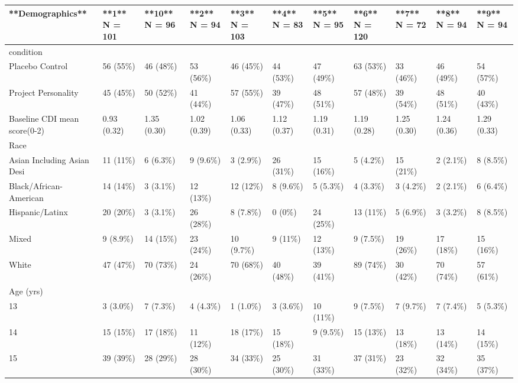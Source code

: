\begin{table}[ht]
\centering
\begin{tabular}{lllllllllll}
  \hline
**Demographics** & **1**  
N = 101 & **10**  
N = 96 & **2**  
N = 94 & **3**  
N = 103 & **4**  
N = 83 & **5**  
N = 95 & **6**  
N = 120 & **7**  
N = 72 & **8**  
N = 94 & **9**  
N = 94 \\ 
  \hline
condition &  &  &  &  &  &  &  &  &  &  \\ 
  Placebo Control & 56 (55\%) & 46 (48\%) & 53 (56\%) & 46 (45\%) & 44 (53\%) & 47 (49\%) & 63 (53\%) & 33 (46\%) & 46 (49\%) & 54 (57\%) \\ 
  Project Personality & 45 (45\%) & 50 (52\%) & 41 (44\%) & 57 (55\%) & 39 (47\%) & 48 (51\%) & 57 (48\%) & 39 (54\%) & 48 (51\%) & 40 (43\%) \\ 
  Baseline CDI mean score(0-2) & 0.93 (0.32) & 1.35 (0.30) & 1.02 (0.39) & 1.06 (0.33) & 1.12 (0.37) & 1.19 (0.31) & 1.19 (0.28) & 1.25 (0.30) & 1.24 (0.36) & 1.29 (0.33) \\ 
  Race &  &  &  &  &  &  &  &  &  &  \\ 
  Asian Including Asian Desi & 11 (11\%) & 6 (6.3\%) & 9 (9.6\%) & 3 (2.9\%) & 26 (31\%) & 15 (16\%) & 5 (4.2\%) & 15 (21\%) & 2 (2.1\%) & 8 (8.5\%) \\ 
  Black/African-American & 14 (14\%) & 3 (3.1\%) & 12 (13\%) & 12 (12\%) & 8 (9.6\%) & 5 (5.3\%) & 4 (3.3\%) & 3 (4.2\%) & 2 (2.1\%) & 6 (6.4\%) \\ 
  Hispanic/Latinx & 20 (20\%) & 3 (3.1\%) & 26 (28\%) & 8 (7.8\%) & 0 (0\%) & 24 (25\%) & 13 (11\%) & 5 (6.9\%) & 3 (3.2\%) & 8 (8.5\%) \\ 
  Mixed & 9 (8.9\%) & 14 (15\%) & 23 (24\%) & 10 (9.7\%) & 9 (11\%) & 12 (13\%) & 9 (7.5\%) & 19 (26\%) & 17 (18\%) & 15 (16\%) \\ 
  White & 47 (47\%) & 70 (73\%) & 24 (26\%) & 70 (68\%) & 40 (48\%) & 39 (41\%) & 89 (74\%) & 30 (42\%) & 70 (74\%) & 57 (61\%) \\ 
  Age (yrs) &  &  &  &  &  &  &  &  &  &  \\ 
  13 & 3 (3.0\%) & 7 (7.3\%) & 4 (4.3\%) & 1 (1.0\%) & 3 (3.6\%) & 10 (11\%) & 9 (7.5\%) & 7 (9.7\%) & 7 (7.4\%) & 5 (5.3\%) \\ 
  14 & 15 (15\%) & 17 (18\%) & 11 (12\%) & 18 (17\%) & 15 (18\%) & 9 (9.5\%) & 15 (13\%) & 13 (18\%) & 13 (14\%) & 14 (15\%) \\ 
  15 & 39 (39\%) & 28 (29\%) & 28 (30\%) & 34 (33\%) & 25 (30\%) & 31 (33\%) & 37 (31\%) & 23 (32\%) & 32 (34\%) & 35 (37\%) \\ 

\end{tabular}
\end{table}
